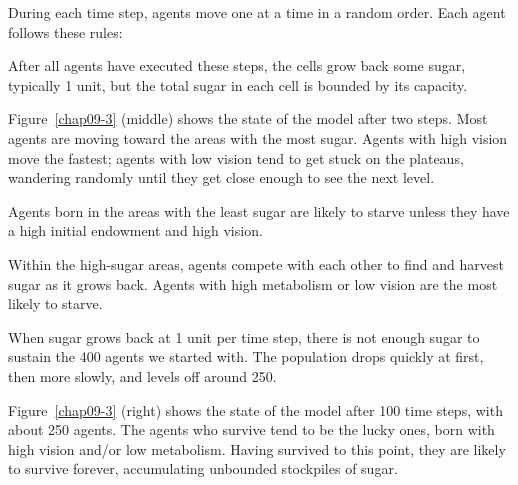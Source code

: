 \documentclass[12pt]{book}
\theoremstyle{exercise}
\newcommand{\py}{\verb}%}
\begin{document}
During each time step, agents move one at a time in a random order.
Each agent follows these rules:


After all agents have executed these steps, the cells grow back
some sugar, typically 1 unit, but the total sugar in each cell is
bounded by its capacity.

Figure~\ref{chap09-3} (middle) shows the state of the model after two
steps.  Most agents are moving toward the areas with the most sugar.
Agents with high vision move the fastest; agents with low vision
tend to get stuck on the plateaus, wandering randomly until they get
close enough to see the next level.

Agents born in the areas with the least sugar are likely to starve
unless they have a high initial endowment and high vision.

Within the high-sugar areas, agents compete with each other to
find and harvest sugar as it grows back.  Agents with high metabolism
or low vision are the most likely to starve.

When sugar grows back at 1 unit per time step, there is not enough
sugar to sustain the 400 agents we started with.  The population
drops quickly at first, then more slowly, and levels off around 250.

Figure~\ref{chap09-3} (right) shows the state of the model after 100
time steps, with about 250 agents.  The agents who survive tend to
be the lucky ones, born with high vision and/or low metabolism.
Having survived to this point, they are likely to survive forever,
accumulating unbounded stockpiles of sugar.
\end{document}
